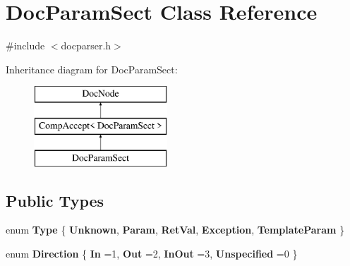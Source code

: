 \hypertarget{class_doc_param_sect}{}\section{Doc\+Param\+Sect Class Reference}
\label{class_doc_param_sect}


{\ttfamily \#include $<$docparser.\+h$>$}

Inheritance diagram for Doc\+Param\+Sect\+:\begin{figure}[H]
\begin{center}
\leavevmode
\includegraphics[height=3.000000cm]{class_doc_param_sect}
\end{center}
\end{figure}
\subsection*{Public Types}
\begin{DoxyCompactItemize}
\item 
\mbox{\label{class_doc_param_sect_a402e8723e8b9f22c5ffa84046224d51a}} 
enum {\bfseries Type} \{ \newline
{\bfseries Unknown}, 
{\bfseries Param}, 
{\bfseries Ret\+Val}, 
{\bfseries Exception}, 
\newline
{\bfseries Template\+Param}
 \}
\item 
\mbox{\label{class_doc_param_sect_ad5e3f053f03f8c333a69208521075c66}} 
enum {\bfseries Direction} \{ {\bfseries In} =1, 
{\bfseries Out} =2, 
{\bfseries In\+Out} =3, 
{\bfseries Unspecified} =0
 \}
\end{DoxyCompactItemize}
